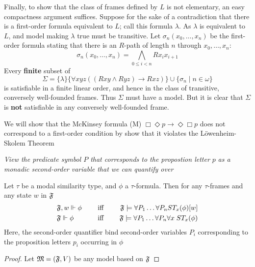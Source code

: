 \documentclass[11pt]{article}
\begin{document}
\begin{examplle}[]
Finally, to show that the class of frames defined by \(L\) is not elementary,
an easy compactness argument suffices. Suppose for the sake of a
contradiction that there is a first-order formula equivalent to \(L\); call
this formula \(\lambda\). As \(\lambda\) is equivalent to \(L\), and model making \(\lambda\) true must be
transitive. Let \(\sigma_n(x_0,\dots,x_n)\) be the first-order formula
stating that there is an \(R\)-path of length \(n\) through
\(x_0,\dots,x_n\):
\begin{equation*}
\sigma_n(x_0,\dots,x_n)=\bigwedge_{0\le i<n}Rx_ix_{i+1}
\end{equation*}
Every \textbf{finite} subset of
\begin{equation*}
\Sigma=\{\lambda\}\{\forall xyz((Rxy\wedge Ryz)\to Rxz)\}\cup\{\sigma_n\mid n\in\omega\}
\end{equation*}
is satisfiable in a finite linear order, and hence in the class of
transitive, conversely well-founded frames. Thus \(\Sigma\) must have a model. But it
is clear that \(\Sigma\) is \textbf{not} satisfiable in any conversely well-founded frame.
\end{examplle}

\begin{examplle}[]
We will show that the McKinsey formula (M) \(\Box\Diamond p\to\Diamond\Box
   p\) does not correspond to a first-order condition by show that it violates
the Löwenheim-Skolem Theorem
\end{examplle}

\begin{center}
\emph{View the predicate symbol \(P\) that corresponds to the propostion letter
\(p\)}
\emph{as a monadic second-order variable that we can quantify over}
\end{center}

\begin{proposition}[]
Let \(\tau\) be a modal similarity type, and \(\phi\) a \(\tau\)-formula. Then for any
\(\tau\)-frames and any state \(w\) in \(\mathfrak{F}\)
\begin{alignat*}{3}
&\mathfrak{F},w\Vdash\phi&\quad\text{ iff }\quad&&\mathfrak{F}\models\forall P_1\dots\forall P_n ST_x(\phi)[w]\\
&\mathfrak{F}\Vdash\phi&\quad\text{ iff }\quad&&\mathfrak{F}\models\forall P_1\dots\forall P_n \forall x\; ST_x(\phi)
\end{alignat*}
Here, the second-order quantifier bind second-order variables \(P_i\)
corresponding to the proposition letters \(p_i\) occurring in \(\phi\)
\end{proposition}

\begin{proof}
Let \(\mathfrak{M}=(\mathfrak{F},V)\) be any model based on \(\mathfrak{F}\)
\end{proof}
\end{document}
